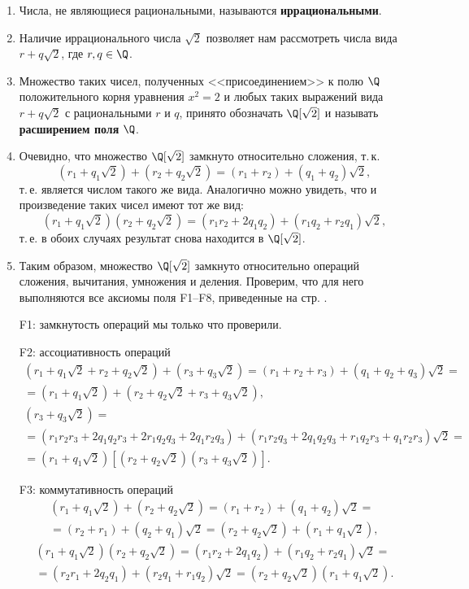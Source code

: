 \begin{enumerate}

\item Числа, не являющиеся рациональными, называются \textbf{иррациональными}.
\item Наличие иррационального числа $\sqrt 2$ позволяет нам рассмотреть числа вида $r+q\sqrt 2$, где $r,q\in\Q$.
\item Множество таких чисел, полученных <<присоединением>> к полю $\Q$ положительного корня уравнения $x^2=2$ и любых таких выражений вида $r+q\sqrt 2$ с рациональными $r$ и $q$, принято обозначать $\Q[\sqrt 2]$ и называть \textbf{расширением поля} $\Q$.
\item Очевидно, что множество $\Q[\sqrt 2]$ замкнуто относительно сложения, т.\,к.
$$
(r_1+q_1\sqrt 2)+(r_2+q_2\sqrt 2)=(r_1+r_2)+(q_1+q_2)\sqrt 2,
$$
т.\,е. является числом такого же вида. Аналогично можно увидеть, что и произведение таких чисел имеют тот же вид:
$$
(r_1+q_1\sqrt 2)(r_2+q_2\sqrt 2)=(r_1r_2+2q_1q_2)+(r_1q_2+r_2q_1)\sqrt 2,
$$
т.\,е. в обоих случаях результат снова находится в $\Q[\sqrt 2]$.
\item Таким образом, множество $\Q[\sqrt 2]$ замкнуто относительно операций сложения, вычитания, умножения и деления. Проверим, что для него выполняются все аксиомы поля F1--F8, приведенные на стр. \pageref{FildAxiom}.

F1: замкнутость операций мы только что проверили.

F2: ассоциативность операций
\begin{multline*}
(r_1+q_1\sqrt 2 + r_2+q_2\sqrt 2)+(r_3+q_3\sqrt 2) = (r_1+r_2+r_3)+(q_1+q_2+q_3)\sqrt 2 = \\
=(r_1+q_1\sqrt 2) + (r_2+q_2\sqrt 2+r_3+q_3\sqrt 2),
\end{multline*}
\begin{multline*}
[(r_1+q_1\sqrt 2)(r_2+q_2\sqrt 2)](r_3+q_3\sqrt 2) = \\
=(r_1r_2r_3 + 2q_1q_2r_3 + 2r_1q_2q_3 + 2q_1r_2q_3) + (r_1r_2q_3 + 2q_1q_2q_3 + r_1q_2r_3 + q_1r_2r_3)\sqrt 2 = \\
=(r_1+q_1\sqrt 2)[(r_2+q_2\sqrt 2)(r_3+q_3\sqrt 2)].
\end{multline*}

F3: коммутативность операций
\begin{multline*}
(r_1+q_1\sqrt 2)+(r_2+q_2\sqrt 2) = (r_1+r_2)+(q_1+q_2)\sqrt 2 = \\
= (r_2+r_1)+(q_2+q_1)\sqrt 2 = (r_2+q_2\sqrt 2)+(r_1+q_1\sqrt 2),
\end{multline*}
\begin{multline*}
(r_1+q_1\sqrt 2)(r_2+q_2\sqrt 2) = (r_1r_2+2q_1q_2)+(r_1q_2+r_2q_1)\sqrt 2 = \\
=(r_2r_1+2q_2q_1)+(r_2q_1+r_1q_2)\sqrt 2 = (r_2+q_2\sqrt 2)(r_1+q_1\sqrt 2).
\end{multline*}


\end{enumerate}

